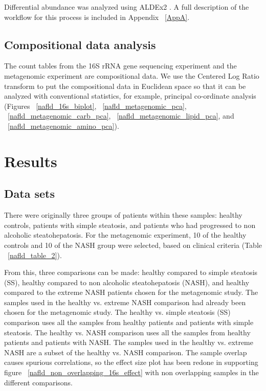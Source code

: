 Differential abundance was analyzed using ALDEx2 \cite{fernandes2014unifying}. A full description of the workflow for this process is included in Appendix ~\ref{AppA}.

\subsection{Compositional data analysis}

The count tables from the 16S rRNA gene sequencing experiment and the metagenomic experiment are compositional data. We use the Centered Log Ratio transform \cite{} to put the compositional data in Euclidean space so that it can be analyzed with conventional statistics, for example, principal co-ordinate analysis (Figures ~\ref{nafld_16s_biplot}, ~\ref{nafld_metagenomic_pca}, ~\ref{nafld_metagenomic_carb_pca}, ~\ref{nafld_metagenomic_lipid_pca}, and ~\ref{nafld_metagenomic_amino_pca}).

\FloatBarrier

\section{Results}

\subsection{Data sets}
There were originally three groups of patients within these samples: healthy controls, patients with simple steatosis, and patients who had progressed to non alcoholic steatohepatosis. For the metagenomic experiment, 10 of the healthy controls and 10 of the NASH group were selected, based on clinical criteria (Table ~\ref{nafld_table_2}).

From this, three comparisons can be made: healthy compared to simple steatosis (SS), healthy compared to non alcoholic steatohepatosis (NASH), and healthy compared to the extreme NASH patients chosen for the metagenomic study. The samples used in the healthy vs. extreme NASH comparison had already been chosen for the metagenomic study. The healthy vs. simple steatosis (SS) comparison uses all the samples from healthy patients and patients with simple steatosis. The healthy vs. NASH comparison uses all the samples from healthy patients and patients with NASH. The samples used in the healthy vs. extreme NASH are a subset of the healthy vs. NASH comparison. The sample overlap causes spurious correlations, so the effect size plot has been redone in supporting figure ~\ref{nafld_non_overlapping_16s_effect} with non overlapping samples in the different comparisons.

